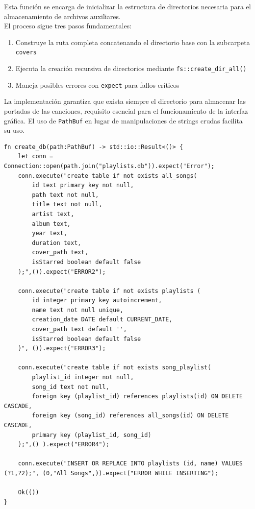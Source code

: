 \documentclass[11pt, a4paper]{article}
\begin{document}
            Esta función se encarga de inicializar la estructura de directorios necesaria para el almacenamiento de archivos auxiliares. \\

            El proceso sigue tres pasos fundamentales:

            \begin{enumerate}
              \item Construye la ruta completa concatenando el directorio base con la subcarpeta \texttt{covers}
              \item Ejecuta la creación recursiva de directorios mediante \texttt{fs::create\_dir\_all()}
              \item Maneja posibles errores con \texttt{expect} para fallos críticos
            \end{enumerate}

            La implementación garantiza que exista siempre el directorio para almacenar las portadas de las canciones, requisito esencial para el funcionamiento de la interfaz gráfica. El uso de \texttt{PathBuf} en lugar de manipulaciones de strings crudas facilita su uso.

            \begin{lstlisting}[caption={fn create\_db()}]
fn create_db(path:PathBuf) -> std::io::Result<()> {
    let conn = Connection::open(path.join("playlists.db")).expect("Error");
    conn.execute("create table if not exists all_songs(
        id text primary key not null,
        path text not null,
        title text not null,
        artist text,
        album text,
        year text,
        duration text,
        cover_path text,
        isStarred boolean default false
    );",()).expect("ERROR2");

    conn.execute("create table if not exists playlists (
        id integer primary key autoincrement,
        name text not null unique,
        creation_date DATE default CURRENT_DATE,
        cover_path text default '',
        isStarred boolean default false
    )", ()).expect("ERROR3");

    conn.execute("create table if not exists song_playlist(
        playlist_id integer not null,
        song_id text not null,
        foreign key (playlist_id) references playlists(id) ON DELETE CASCADE,
        foreign key (song_id) references all_songs(id) ON DELETE CASCADE,
        primary key (playlist_id, song_id)
    );",() ).expect("ERROR4");

    conn.execute("INSERT OR REPLACE INTO playlists (id, name) VALUES (?1,?2);", (0,"All Songs",)).expect("ERROR WHILE INSERTING");

    Ok(())
}
            \end{lstlisting}
\end{document}
